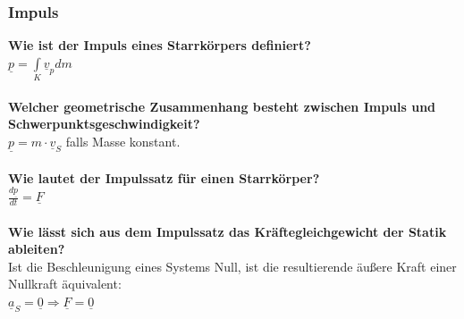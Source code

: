 \documentclass[a4paper,twocolumn,10pt]{article}
\begin{document}
\subsubsection{Impuls}
\textbf{Wie ist der Impuls eines Starrkörpers definiert?}\\
$\underline{p}=\int\limits_K\underline{v}_pdm$\\\\
\textbf{Welcher geometrische Zusammenhang besteht zwischen Impuls und Schwerpunktsgeschwindigkeit?}\\
$\underline{p}=m\cdot\underline{v}_S$ falls Masse konstant.\\\\
\textbf{Wie lautet der Impulssatz für einen Starrkörper?}\\
$\frac{d\underline{p}}{dt}=\underline{F}$\\\\
\textbf{Wie lässt sich aus dem Impulssatz das Kräftegleichgewicht der Statik ableiten?}\\
Ist die Beschleunigung eines Systems Null, ist die resultierende äußere Kraft einer Nullkraft äquivalent:\\
$\underline{a}_S=\underline{0}\Rightarrow\underline{F}=\underline{0}$
\end{document}
